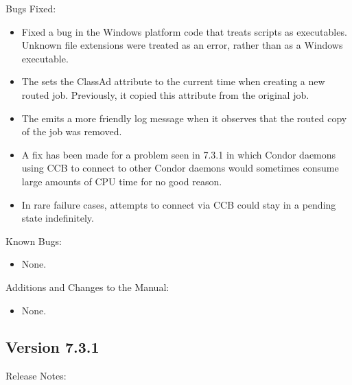 \noindent Bugs Fixed:

\begin{itemize}

\item Fixed a bug in the Windows platform code that treats scripts as
  executables.
  Unknown file extensions were treated as an error,
  rather than as a Windows executable.

\item The  sets the ClassAd attribute
 to the current time when creating a new routed job.
Previously, it copied this attribute from the original job.

\item The  emits a more friendly log message when it
observes that the routed copy of the job was removed.

\item A fix has been made for a problem seen in 7.3.1 in which Condor daemons
using CCB to connect to other Condor daemons would sometimes consume
large amounts of CPU time for no good reason.

\item In rare failure cases, attempts to connect via CCB could stay in
a pending state indefinitely.

\end{itemize}

\noindent Known Bugs:

\begin{itemize}

\item None.

\end{itemize}

\noindent Additions and Changes to the Manual:

\begin{itemize}

\item None.

\end{itemize}


\subsection*{\label{sec:New-7-3-1}Version 7.3.1}

\noindent Release Notes:

